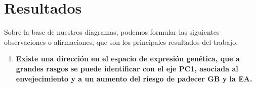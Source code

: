 \chapter{Resultados}
\label{cap3}
\onehalfspacing

Sobre la base de nuestros diagramas, podemos formular las siguientes observaciones o afirmaciones, que son los principales resultados del trabajo.

\begin{enumerate}
	\item  \textbf{Existe una dirección en el espacio de expresión genética, que a grandes rasgos se puede identificar con el eje PC1, asociada al envejecimiento y a un aumento del riesgo de padecer GB y la EA.}
\end{enumerate}
